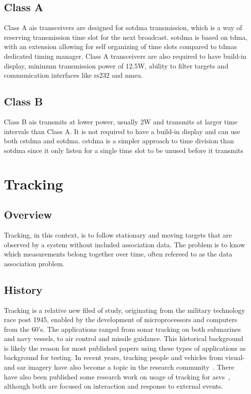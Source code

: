 \subsection{Class A}
Class A \gls{ais} transceivers are designed for \gls{sotdma} transmission, which is a way of reserving transmission time slot for the next broadcast. \gls{sotdma} is based on \gls{tdma}, with an extension allowing for self organizing of time slots compared to \glspl{tdma} dedicated timing manager. Class A transceivers are also required to have build-in display, minimum transmission power of 12.5W, ability to filter targets and communication interfaces like \gls{rs232} and \gls{nmea}.

\subsection{Class B}
Class B \gls{ais} transmits at lower power, usually 2W and transmits at larger time intervals than Class A. It is not required to have a build-in display and can use both \gls{cstdma} and \gls{sotdma}. \gls{cstdma} is a simpler approach to time division than \gls{sotdma} since it only listen for a single time slot to be unused before it transmits

\section{Tracking}
\subsection{Overview}
Tracking, in this context, is to follow stationary and moving targets that are observed by a system without included association data. The problem is to know which measurements belong together over time, often refereed to as the data association problem.

\subsection{History}
Tracking is a relative new filed of study, originating from the military technology race post 1945, enabled by the development of microprocessors and computers from the 60's. The applications ranged from sonar tracking on both submarines and navy vessels, to air control and missile guidance. This historical background is likely the reason for most published papers using these types of applications as background for testing. In recent years, tracking people and vehicles from visual- and \gls{sar} imagery have also become a topic in the research community~\cite{Carthel2007,Carthel2007a,Coraluppi2000}. There have also been published some research work on usage of tracking for \glspl{asv}~\cite{Wolf2010,Svec2014}, although both are focused on interaction and response to external events.

